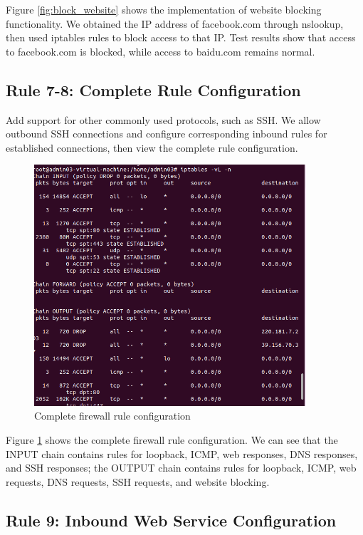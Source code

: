 \documentclass[12pt,a4paper]{article}
\begin{document}
Figure \ref{fig:block_website} shows the implementation of website blocking functionality. We obtained the IP address of facebook.com through nslookup, then used iptables rules to block access to that IP. Test results show that access to facebook.com is blocked, while access to baidu.com remains normal.

\subsection{Rule 7-8: Complete Rule Configuration}

Add support for other commonly used protocols, such as SSH. We allow outbound SSH connections and configure corresponding inbound rules for established connections, then view the complete rule configuration.

\begin{figure}[H]
    \centering
    \includegraphics[width=0.9\textwidth]{09_complete_rules.png}
    \caption{Complete firewall rule configuration}
    \label{fig:complete_rules}
\end{figure}

Figure \ref{fig:complete_rules} shows the complete firewall rule configuration. We can see that the INPUT chain contains rules for loopback, ICMP, web responses, DNS responses, and SSH responses; the OUTPUT chain contains rules for loopback, ICMP, web requests, DNS requests, SSH requests, and website blocking.

\subsection{Rule 9: Inbound Web Service Configuration}
\end{document}
